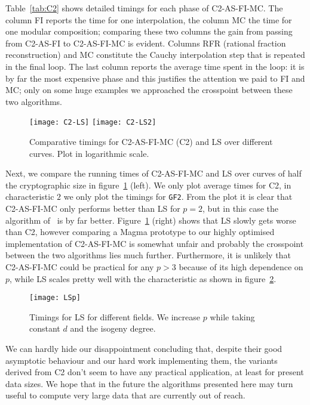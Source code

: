Table~\ref{tab:C2} shows detailed timings for each phase of
C2-AS-FI-MC. The column FI reports the time for one interpolation, the
column MC the time for one modular composition; comparing these two
columns the gain from passing from C2-AS-FI to C2-AS-FI-MC is
evident. Columns RFR (rational fraction reconstruction) and MC
constitute the Cauchy interpolation step that is repeated in the final
loop. The last column reports the average time spent in the loop: it
is by far the most expensive phase and this justifies the attention we
paid to FI and MC; only on some huge examples we approached the
crosspoint between these two algorithms.

\begin{figure}
  \centering
  \texttt{[image: C2-LS]}
   \texttt{[image: C2-LS2]}
   \caption{Comparative timings for C2-AS-FI-MC (C2) and LS over
     different curves. Plot in logarithmic scale.}
  \label{fig:comp}
\end{figure}

Next, we compare the running times of C2-AS-FI-MC and LS over curves
of half the cryptographic size in figure~\ref{fig:comp} (left). We
only plot average times for C2, in characteristic $2$ we only plot the
timings for \texttt{GF2}. From the plot it is clear that C2-AS-FI-MC
only performs better than LS for $p=2$, but in this case the algorithm
of~\cite{Ler96} is by far better.  Figure~\ref{fig:comp} (right) shows
that LS slowly gets worse than C2, however comparing a Magma prototype
to our highly optimised implementation of C2-AS-FI-MC is somewhat
unfair and probably the crosspoint between the two algorithms lies
much further. Furthermore, it is unlikely that C2-AS-FI-MC could be
practical for any $p>3$ because of its high dependence on $p$, while
LS scales pretty well with the characteristic as shown in
figure~\ref{fig:LSp}.

\begin{figure}
  \centering
  \texttt{[image: LSp]}
  \caption{Timings for LS for different fields. We increase
    $p$ while taking constant $d$ and the isogeny degree.}
  \label{fig:LSp}
\end{figure}

We can hardly hide our disappointment concluding that, despite their
good asymptotic behaviour and our hard work implementing them, the
variants derived from C2 don't seem to have any practical application,
at least for present data sizes. We hope that in the future the
algorithms presented here may turn useful to compute very large data
that are currently out of reach.




%

